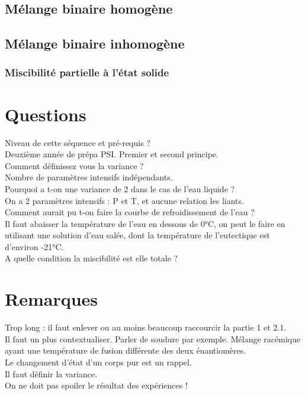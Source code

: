 \documentclass[12pt,prb,aps,epsf]{article}
\begin{document}
\subsection{Mélange binaire homogène}
\subsection{Mélange binaire inhomogène}
\subsubsection{Miscibilité partielle à l'état solide}

\section*{Questions}
Niveau de cette séquence et pré-requis ?\\
Deuxième année de prépa PSI. Premier et second principe.\\

Comment définissez vous la variance ?\\
Nombre de paramètres intensifs indépendants.\\

Pourquoi a t-on une variance de 2 dans le cas de l'eau liquide ?\\
On a 2 paramètres intensifs : P et T, et aucune relation les liants.\\

Comment aurait pu t-on faire la courbe de refroidissement de l'eau ?\\ 
Il faut abaisser la température de l'eau en dessous de 0°C, on peut le faire en utilisant une solution d'eau salée, dont la température de l'eutectique est d'environ -21°C.\\

A quelle condition la miscibilité est elle totale ?

\section*{Remarques}
Trop long : il faut enlever ou au moins beaucoup raccourcir la partie 1 et 2.1.\\
Il faut un plus contextualiser. Parler de soudure par exemple. Mélange racémique ayant une température de fusion différente des deux énantiomères.\\
Le changement d'état d'un corps pur est un rappel.\\
Il faut définir la variance.\\
On ne doit pas spoiler le résultat des expériences !\\
\end{document}
